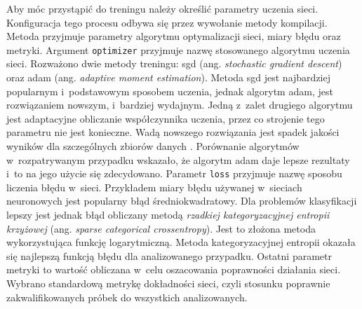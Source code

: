 Aby móc przystąpić do treningu należy określić parametry uczenia sieci.
Konfiguracja tego procesu odbywa się przez wywołanie metody kompilacji.
Metoda przyjmuje parametry algorytmu optymalizacji sieci, miary błędu oraz
metryki.
Argument \texttt{optimizer} przyjmuje  nazwę stosowanego algorytmu
uczenia sieci.
Rozważono dwie metody treningu: sgd (ang. \textit{stochastic gradient descent})
oraz adam (ang. \textit{adaptive moment estimation}).
Metoda sgd jest najbardziej popularnym i~podstawowym sposobem uczenia, jednak
algorytm adam, jest rozwiązaniem nowszym, i~bardziej wydajnym.
Jedną z~zalet drugiego algorytmu jest adaptacyjne obliczanie współczynnika
uczenia, przez co strojenie tego parametru nie jest konieczne.
Wadą nowszego rozwiązania jest spadek jakości wyników dla szczególnych zbiorów
danych \cite[str. 299]{geron_ml}.
Porównanie algorytmów w~rozpatrywanym przypadku wskazało, że algorytm adam daje
lepsze rezultaty i~to na jego użycie się zdecydowano.
Parametr \texttt{loss} przyjmuje nazwę sposobu liczenia błędu
w~sieci.
Przykładem miary błędu używanej w~sieciach neuronowych jest popularny błąd
średniokwadratowy.
Dla problemów klasyfikacji lepszy jest jednak błąd obliczany metodą
\emph{rzadkiej kategoryzacyjnej entropii krzyżowej} (ang. \textit{sparse
categorical crossentropy}).
Jest to złożona metoda wykorzystująca funkcję logarytmiczną.
Metoda kategoryzacyjnej entropii okazała się najlepszą funkcją błędu dla
analizowanego przypadku.
Ostatni parametr metryki to wartość obliczana w~celu oszacowania poprawności
działania sieci.
Wybrano standardową metrykę dokładności sieci, czyli stosunku poprawnie
zakwalifikowanych próbek do wszystkich analizowanych.

